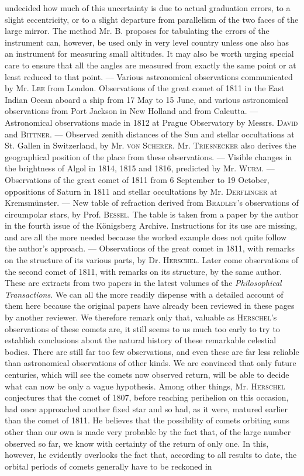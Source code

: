 undecided how much of this uncertainty is due to actual graduation errors, to a slight eccentricity, or to a slight departure from parallelism of the two faces of the large mirror. The method Mr. B. proposes for tabulating the errors of the instrument can, however, be used only in very level country unless one also has an instrument for measuring small altitudes. It may also be worth urging special care to ensure that all the angles are measured from exactly the same point or at least reduced to that point. — Various astronomical observations communicated by Mr. \textsc{Lee} from London. Observations of the great comet of 1811 in the East Indian Ocean aboard a ship from 17 May to 15 June, and various astronomical observations from Port Jackson in New Holland and from Calcutta. — Astronomical observations made in 1812 at Prague Observatory by Messrs. \textsc{David} and \textsc{Bittner}. — Observed zenith distances of the Sun and stellar occultations at St. Gallen in Switzerland, by Mr. \textsc{von Scherer}. Mr. \textsc{Triesnecker} also derives the geographical position of the place from these observations. — Visible changes in the brightness of Algol in 1814, 1815 and 1816, predicted by Mr. \textsc{Wurm}. — Observations of the great comet of 1811 from 6 September to 19 October, oppositions of Saturn in 1811 and stellar occultations by Mr. \textsc{Derflinger} at Kremsmünster. — New table of refraction derived from \textsc{Bradley}'s observations of circumpolar stars, by Prof. \textsc{Bessel}. The table is taken from a paper by the author in the fourth issue of the Königsberg Archive. Instructions for its use are missing, and are all the more needed because the worked example does not quite follow the author's approach. — Observations of the great comet in 1811, with remarks on the structure of its various parts, by Dr. \textsc{Herschel}. Later come observations of the second comet of 1811, with remarks on its structure, by the same author. These are extracts from two papers in the latest volumes of the \emph{Philosophical Transactions}. We can all the more readily dispense with a detailed account of them here because the original papers have already been reviewed in these pages by another reviewer. We therefore remark only that, valuable as \textsc{Herschel}'s observations of these comets are, it still seems to us much too early to try to establish conclusions about the natural history of these remarkable celestial bodies. There are still far too few observations, and even these are far less reliable than astronomical observations of other kinds. We are convinced that only future centuries, which will see the comets now observed return, will be able to decide what can now be only a vague hypothesis. Among other things, Mr. \textsc{Herschel} conjectures that the comet of 1807, before reaching perihelion on this occasion, had once approached another fixed star and so had, as it were, matured earlier than the comet of 1811. He believes that the possibility of comets orbiting suns other than our own is made very probable by the fact that, of the large number observed so far, we know with certainty of the return of only one. In this, however, he evidently overlooks the fact that, according to all results to date, the orbital periods of comets generally have to be reckoned in 